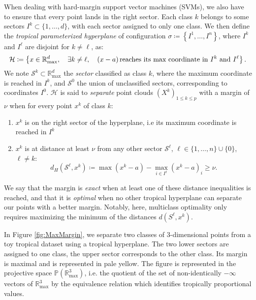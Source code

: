 \documentclass[oneside,UKenglish,a4paper]{amsart}
\numberwithin{equation}{section}
\numberwithin{figure}{section}
\theoremstyle{plain}
\theoremstyle{definition}
\theoremstyle{plain}
\theoremstyle{remark}
\theoremstyle{plain}
\theoremstyle{definition}
\theoremstyle{definition}
\begin{document}
When dealing with hard-margin support vector machines (SVMs),
we also have to ensure that every point lands in the right sector. Each class $k$ belongs to some sectors $I^k\subset \{1,\ldots, d\}$, with each sector assigned to only one class. We then define the \emph{tropical parameterized hyperplane} of configuration
$\sigma\coloneqq\left\{I^{1},\ldots,I^{n}\right\}$, where $I^{k}$ and $I^{\ell}$
are disjoint for $k\ne\ell$, as:
\[
\mathcal{H}\coloneqq\left\{x\in\mathbb{R}_{\max}^{d},\quad\exists k\ne\ell,\quad (x-a)\,\text{reaches its max coordinate in \ensuremath{I^{k}} and \ensuremath{I^{\ell}}}\right\}.
\]
We note $\mathcal{S}^k\subset \mathbb{R}_{\max}^d$ the \emph{sector} classified as class $k$, where the maximum coordinate is reached in $I^k$, and $\mathcal{S}^{0}$ the union of unclassified sectors, corresponding to coordinates $I^0$. $\mathcal{H}$ is said to \emph{separate} point
clouds $(X^{k})_{1\le k\le p}$ with a margin of $\nu$ when for every point
$x^{k}$ of class $k$:
\begin{enumerate}
\item $x^{k}$ is on the right sector of the hyperplane, i.e its maximum
coordinate is reached in $I^{k}$
\item $x^{k}$ is at distance at least $\nu$ from any other sector $\mathcal{S}^\ell$, $\ell \in \{1,\ldots, n\} \cup \{0\}$, $\ell \ne k$:
\begin{equation*}
d_H(\mathcal{S}^\ell,x^{k})\coloneqq\max(x^{k}-a)-\max_{i\in I^\ell}(x^{k}-a)_i\ge\nu.
\end{equation*}

\end{enumerate}


We say that the margin is \emph{exact} when at least one of these distance inequalities is reached, and that it is \emph{optimal} when no other tropical hyperplane can separate our points with a better margin. Notably, here, multiclass optimality only requires maximizing the minimum of the distances $d(S^\ell, x^k)$.


In Figure \ref{fig:MaxMargin}, we separate two classes
of $3$-dimensional points from a toy tropical dataset using a tropical
hyperplane. The two lower sectors are assigned to one class, the upper sector corresponds to the other class. Its margin is maximal and is represented in pale yellow. The figure is represented in the projective space $\mathbb{P}\left(\mathbb{R}_{\text{max}}^{3}\right)$,
i.e. the quotient of the set of non-identically $-\infty$ vectors
of $\mathbb{R}_{\text{max}}^{3}$ by the equivalence relation which
identifies tropically proportional values.
\end{document}
